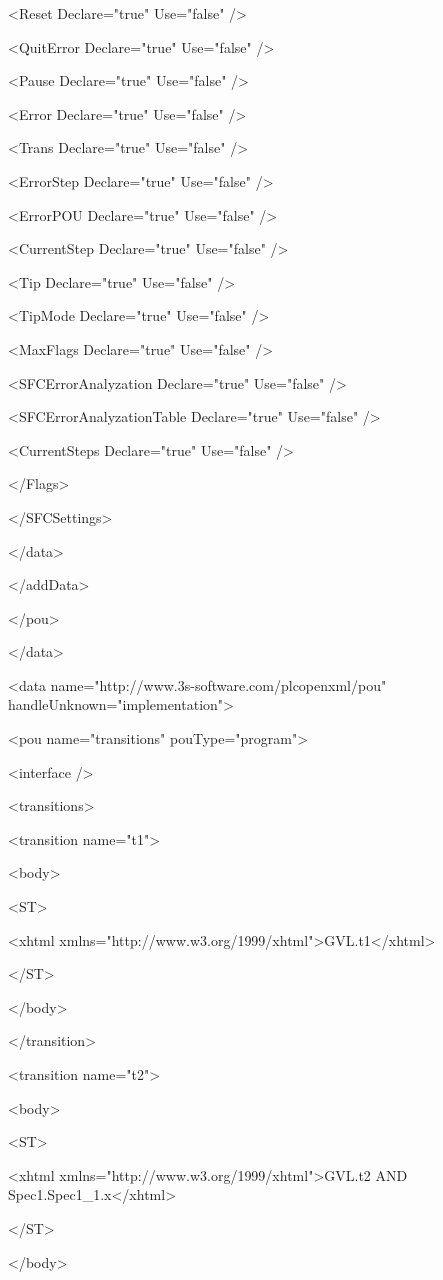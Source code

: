 {   <Reset Declare="true" Use="false" />

   <QuitError Declare="true" Use="false" />

   <Pause Declare="true" Use="false" />

   <Error Declare="true" Use="false" />

   <Trans Declare="true" Use="false" />

   <ErrorStep Declare="true" Use="false" />

   <ErrorPOU Declare="true" Use="false" />

   <CurrentStep Declare="true" Use="false" />

   <Tip Declare="true" Use="false" />

   <TipMode Declare="true" Use="false" />

   <MaxFlags Declare="true" Use="false" />

   <SFCErrorAnalyzation Declare="true" Use="false" />

   <SFCErrorAnalyzationTable Declare="true" Use="false" />

   <CurrentSteps Declare="true" Use="false" />

  </Flags>

 </SFCSettings>

</data>

</addData>

</pou>

</data>

<data name="http://www.3s-software.com/plcopenxml/pou" handleUnknown="implementation">

<pou name="transitions" pouType="program">

<interface />

<transitions>

<transition name="t1">

 <body>

  <ST>

   <xhtml xmlns="http://www.w3.org/1999/xhtml">GVL.t1</xhtml>

  </ST>

 </body>

</transition>

<transition name="t2">

 <body>

  <ST>

   <xhtml xmlns="http://www.w3.org/1999/xhtml">GVL.t2 AND Spec1.Spec1\_1.x</xhtml>

  </ST>

 </body>

}
